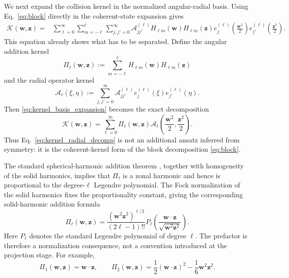 \documentclass[11pt]{article}
\numberwithin{equation}{section}
\theoremstyle{definition}
\begin{document}
We next expand the collision kernel in the normalized angular-radial basis.
Using Eq.~\eqref{eq:block} directly in the coherent-state expansion gives
\begin{align}
 \mathcal K(\bm w,\bm z)
 ={}&
 \sum_{\ell=0}^\infty\sum_{m=-\ell}^{\ell}
 \sum_{j,j'=0}^\infty
 \mathcal A^{(\ell)}_{jj'}
 H_{\ell m}(\bm w)H_{\ell m}(\bm z)
 e_j^{(\ell)}\!\left(\frac{\bm w^2}{2}\right)
 e_{j'}^{(\ell)}\!\left(\frac{\bm z^2}{2}\right).
 \label{eq:kernel_basis_expansion}
\end{align}
This equation already shows what has to be separated.  Define the angular
addition kernel
\begin{equation}
 \Pi_\ell(\bm w,\bm z)
 :=\sum_{m=-\ell}^{\ell}H_{\ell m}(\bm w)H_{\ell m}(\bm z)
 \label{eq:Pi_def}
\end{equation}
and the radial operator kernel
\begin{equation}
 \boxed{
 \mathscr A_\ell(\xi,\eta)
 :=
 \sum_{j,j'=0}^\infty
 \mathcal A^{(\ell)}_{jj'}
 e_j^{(\ell)}(\xi)e_{j'}^{(\ell)}(\eta).
 }
 \label{eq:radial_kernel_definition}
\end{equation}
Then \eqref{eq:kernel_basis_expansion} becomes the exact decomposition
\begin{equation}
 \mathcal K(\bm w,\bm z)
 =\sum_{\ell=0}^\infty
 \Pi_\ell(\bm w,\bm z)
 \mathscr A_\ell\!\left(\frac{\bm w^2}{2},\frac{\bm z^2}{2}\right).
 \label{eq:kernel_radial_decomp}
\end{equation}
Thus Eq.~\eqref{eq:kernel_radial_decomp} is not an additional ansatz inferred
from symmetry: it is the coherent-kernel form of the block decomposition
\eqref{eq:block}.

The standard spherical-harmonic addition theorem \cite{NIST2010}, together
with homogeneity of the solid harmonics, implies that $\Pi_\ell$ is a zonal
harmonic and hence is proportional to the degree-$\ell$ Legendre polynomial.
The Fock normalization of the solid harmonics fixes the proportionality
constant, giving the corresponding solid-harmonic addition formula
\begin{equation}
 \Pi_\ell(\bm w,\bm z)
 =
 \frac{(\bm w^2\bm z^2)^{\ell/2}}{(2\ell-1)!!}
 P_\ell\!\left(
 \frac{\bm w\cdot\bm z}{\sqrt{\bm w^2\bm z^2}}
 \right).
 \label{eq:harmonic_kernel}
\end{equation}
Here $P_\ell$ denotes the standard Legendre polynomial of degree $\ell$.
The prefactor is therefore a normalization consequence, not a convention
introduced at the projection stage.  For example,
\begin{equation}
 \Pi_1(\bm w,\bm z)=\bm w\cdot\bm z,
 \qquad
 \Pi_2(\bm w,\bm z)
 =\frac12(\bm w\cdot\bm z)^2-\frac16\bm w^2\bm z^2.
 \label{eq:Pi_low_orders}
\end{equation}
\end{document}
